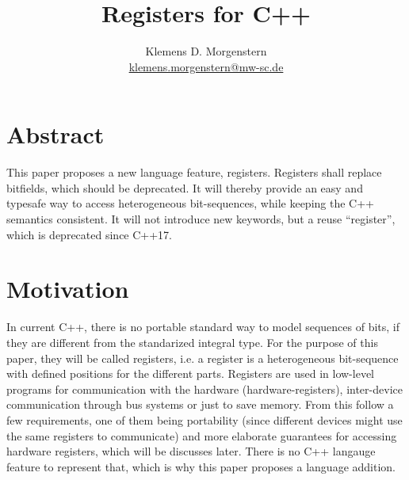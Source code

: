 \documentclass{report}
\begin{document}
\title{Registers for C++}
\author{Klemens D. Morgenstern
\\\href{mailto:klemens.morgenstern@mw-sc.de}{klemens.morgenstern@mw-sc.de}}

\thispagestyle{empty}
\begingroup
\def\hd{\begin{tabular}{ll}
          \textbf{Document Number:} & {\larger\docno}             \\
          \textbf{Date:}            & \today                      \\
          \textbf{Revises:}         & \prevdocno                  \\
          \textbf{Reply to:}        & Klemens D. Morgenstern      \\
                                    & klemens.morgenstern@gmx.net
          \end{tabular}
}

\maketitle

\newpage


\tableofcontents

\chapter*{Abstract}
 This paper proposes a new language feature, registers. Registers shall replace bitfields, which should be deprecated. It will thereby provide an easy and typesafe way to access heterogeneous bit-sequences, while keeping the C++ semantics consistent. It will not introduce new keywords, but a reuse ``register'', which is deprecated since C++17.

\chapter{Motivation}
In current C++, there is no portable standard way to model sequences of bits, if they are different from the standarized integral type. For the purpose of this paper, they will be called registers, i.e. a register is a heterogeneous bit-sequence with defined positions for the different parts.
Registers are used in low-level programs for communication with the hardware (hardware-registers), inter-device communication through bus systems or just to save memory. From this follow a few requirements, one of them being portability (since different devices might use the same registers to communicate) and more elaborate guarantees for accessing hardware registers, which will be discusses later. There is no C++ langauge feature to represent that, which is why this paper proposes a language addition.
\end{document}
